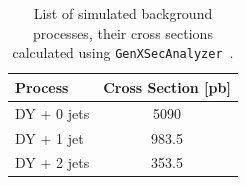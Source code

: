 \begin{table}[htb!]
	\centering
	\caption[List of simulated background processes, their cross sections calculated using \texttt{GenXSecAnalyzer}.]
	{List of simulated background processes, their cross sections calculated using \texttt{GenXSecAnalyzer}~\cite{genxsecana}.}
	\label{tab:mcsamples}
	\begin{tabular}{l c}\hline
		Process & Cross Section [pb]\\
		\hline
		DY + 0 jets & 5090 \\
		DY + 1 jet & 983.5\\
		DY + 2 jets & 353.5 \\
		\hline
	\end{tabular}
	
\end{table}

